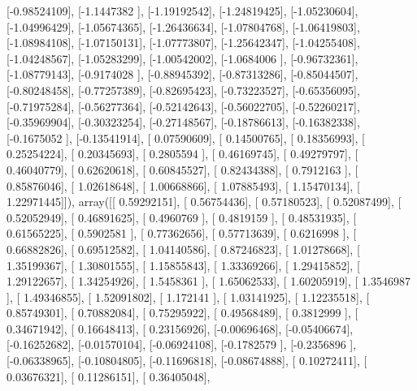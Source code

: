 \documentclass{article}
\begin{document}
       [-0.98524109],
       [-1.1447382 ],
       [-1.19192542],
       [-1.24819425],
       [-1.05230604],
       [-1.04996429],
       [-1.05674365],
       [-1.26436634],
       [-1.07804768],
       [-1.06419803],
       [-1.08984108],
       [-1.07150131],
       [-1.07773807],
       [-1.25642347],
       [-1.04255408],
       [-1.04248567],
       [-1.05283299],
       [-1.00542002],
       [-1.0684006 ],
       [-0.96732361],
       [-1.08779143],
       [-0.9174028 ],
       [-0.88945392],
       [-0.87313286],
       [-0.85044507],
       [-0.80248458],
       [-0.77257389],
       [-0.82695423],
       [-0.73223527],
       [-0.65356095],
       [-0.71975284],
       [-0.56277364],
       [-0.52142643],
       [-0.56022705],
       [-0.52260217],
       [-0.35969904],
       [-0.30323254],
       [-0.27148567],
       [-0.18786613],
       [-0.16382338],
       [-0.1675052 ],
       [-0.13541914],
       [ 0.07590609],
       [ 0.14500765],
       [ 0.18356993],
       [ 0.25254224],
       [ 0.20345693],
       [ 0.2805594 ],
       [ 0.46169745],
       [ 0.49279797],
       [ 0.46040779],
       [ 0.62620618],
       [ 0.60845527],
       [ 0.82434388],
       [ 0.7912163 ],
       [ 0.85876046],
       [ 1.02618648],
       [ 1.00668866],
       [ 1.07885493],
       [ 1.15470134],
       [ 1.22971445]]), array([[ 0.59292151],
       [ 0.56754436],
       [ 0.57180523],
       [ 0.52087499],
       [ 0.52052949],
       [ 0.46891625],
       [ 0.4960769 ],
       [ 0.4819159 ],
       [ 0.48531935],
       [ 0.61565225],
       [ 0.5902581 ],
       [ 0.77362656],
       [ 0.57713639],
       [ 0.6216998 ],
       [ 0.66882826],
       [ 0.69512582],
       [ 1.04140586],
       [ 0.87246823],
       [ 1.01278668],
       [ 1.35199367],
       [ 1.30801555],
       [ 1.15855843],
       [ 1.33369266],
       [ 1.29415852],
       [ 1.29122657],
       [ 1.34254926],
       [ 1.5458361 ],
       [ 1.65062533],
       [ 1.60205919],
       [ 1.3546987 ],
       [ 1.49346855],
       [ 1.52091802],
       [ 1.172141  ],
       [ 1.03141925],
       [ 1.12235518],
       [ 0.85749301],
       [ 0.70882084],
       [ 0.75295922],
       [ 0.49568489],
       [ 0.3812999 ],
       [ 0.34671942],
       [ 0.16648413],
       [ 0.23156926],
       [-0.00696468],
       [-0.05406674],
       [-0.16252682],
       [-0.01570104],
       [-0.06924108],
       [-0.1782579 ],
       [-0.2356896 ],
       [-0.06338965],
       [-0.10804805],
       [-0.11696818],
       [-0.08674888],
       [ 0.10272411],
       [ 0.03676321],
       [ 0.11286151],
       [ 0.36405048],
\end{document}
